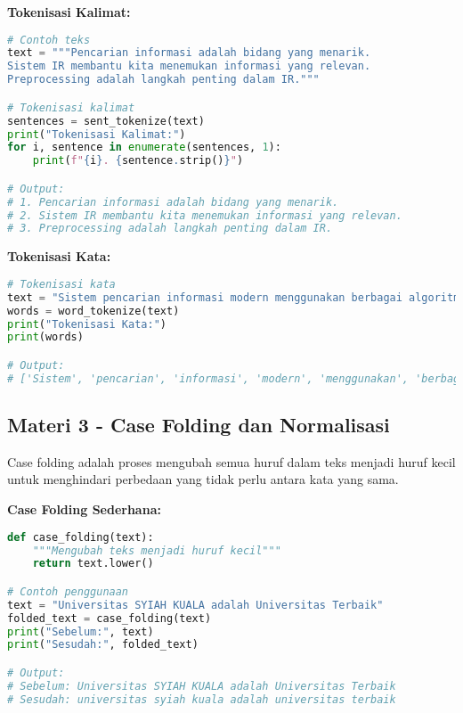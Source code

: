 \textbf{Tokenisasi Kalimat:}
\begin{lstlisting}[language=python, style=python]
# Contoh teks
text = """Pencarian informasi adalah bidang yang menarik.
Sistem IR membantu kita menemukan informasi yang relevan.
Preprocessing adalah langkah penting dalam IR."""

# Tokenisasi kalimat
sentences = sent_tokenize(text)
print("Tokenisasi Kalimat:")
for i, sentence in enumerate(sentences, 1):
    print(f"{i}. {sentence.strip()}")

# Output:
# 1. Pencarian informasi adalah bidang yang menarik.
# 2. Sistem IR membantu kita menemukan informasi yang relevan.
# 3. Preprocessing adalah langkah penting dalam IR.
\end{lstlisting}

\textbf{Tokenisasi Kata:}
\begin{lstlisting}[language=python, style=python]
# Tokenisasi kata
text = "Sistem pencarian informasi modern menggunakan berbagai algoritma."
words = word_tokenize(text)
print("Tokenisasi Kata:")
print(words)

# Output:
# ['Sistem', 'pencarian', 'informasi', 'modern', 'menggunakan', 'berbagai', 'algoritma', '.']
\end{lstlisting}

\subsection*{Materi 3 - Case Folding dan Normalisasi}

Case folding adalah proses mengubah semua huruf dalam teks menjadi huruf kecil untuk menghindari perbedaan yang tidak perlu antara kata yang sama.

\textbf{Case Folding Sederhana:}
\begin{lstlisting}[language=python, style=python]
def case_folding(text):
    """Mengubah teks menjadi huruf kecil"""
    return text.lower()

# Contoh penggunaan
text = "Universitas SYIAH KUALA adalah Universitas Terbaik"
folded_text = case_folding(text)
print("Sebelum:", text)
print("Sesudah:", folded_text)

# Output:
# Sebelum: Universitas SYIAH KUALA adalah Universitas Terbaik
# Sesudah: universitas syiah kuala adalah universitas terbaik
\end{lstlisting}

